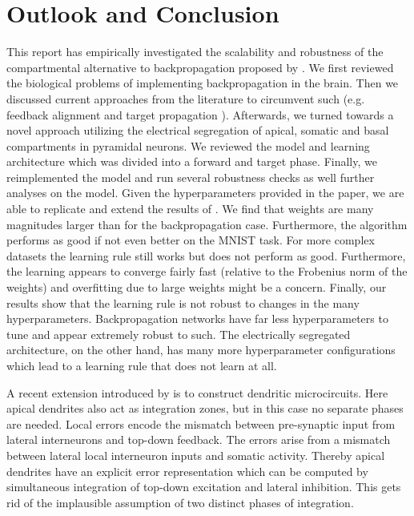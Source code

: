 \documentclass[colorinlistoftodos]{article}
\theoremstyle{definition}
\begin{document}
\section{Outlook and Conclusion}

This report has empirically investigated the scalability and robustness of the compartmental alternative to backpropagation proposed by \citet{guerguiev2017}. We first reviewed the biological problems of implementing backpropagation in the brain. Then we discussed current approaches from the literature to circumvent such (e.g. feedback alignment \citep{lillicrap2016} and target propagation \citep{lee2015}). Afterwards, we turned towards a novel approach utilizing the electrical segregation of apical, somatic and basal compartments in pyramidal neurons. We reviewed the model and learning architecture which was divided into a forward and target phase. 
Finally, we reimplemented the model and run several robustness checks as well further analyses on the model. Given the hyperparameters provided in the paper, we are able to replicate and extend the results of \citet{guerguiev2017}. We find that weights are many magnitudes larger than for the backpropagation case. Furthermore, the algorithm performs as good if not even better on the MNIST task. 
For more complex datasets the learning rule still works but does not perform as good. Furthermore, the learning appears to converge fairly fast (relative to the Frobenius norm of the weights) and overfitting due to large weights might be a concern.
Finally, our results show that the learning rule is not robust to changes in the many hyperparameters. Backpropagation networks have far less hyperparameters to tune and appear extremely robust to such. The electrically segregated architecture, on the other hand, has many more hyperparameter configurations which lead to a learning rule that does not learn at all.

A recent extension introduced by \citet{sacramento2018} is to construct dendritic microcircuits. Here apical dendrites also act as integration zones, but in this case no separate phases are needed. Local errors encode the mismatch between pre-synaptic input from lateral interneurons and top-down feedback. The errors arise from a mismatch between lateral local interneuron inputs and somatic activity. Thereby apical dendrites have an explicit error representation which can be computed by simultaneous integration of top-down excitation and lateral inhibition. This gets rid of the implausible assumption of two distinct phases of integration.
\end{document}
